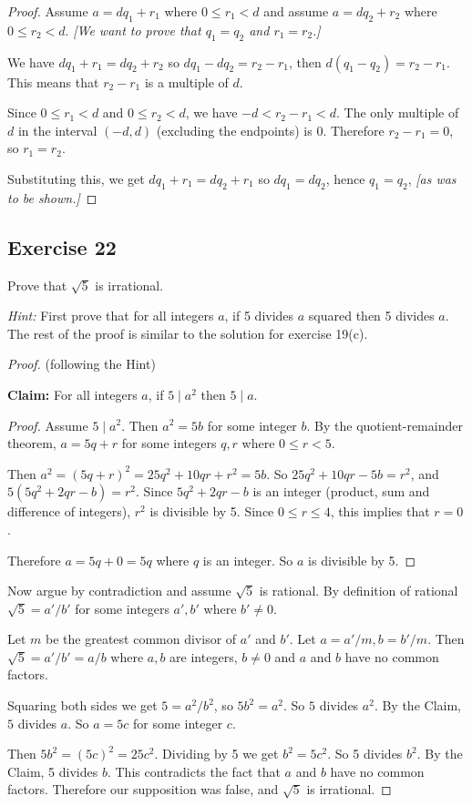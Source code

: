 \documentclass[14pt]{extarticle}
\begin{document}
\begin{proof}
Assume $a = dq_1 + r_1$ where $0 \leq r_1 < d$ and assume $a = dq_2 + r_2$ where $0 \leq r_2 < d$. {\it [We want to prove that $q_1 = q_2$ and $r_1 = r_2$.]}

We have $dq_1 + r_1 = dq_2 + r_2$ so $dq_1 - dq_2 = r_2 - r_1$, then $d(q_1 - q_2) = r_2 - r_1$. This means that $r_2 - r_1$ is a multiple of $d$.

Since $0 \leq r_1 < d$ and $0 \leq r_2 < d$, we have $-d < r_2 - r_1 < d$. The only multiple of $d$ in the interval $(-d, d)$ (excluding the endpoints) is 0. Therefore $r_2 - r_1 = 0$, so $r_1 = r_2$.

Substituting this, we get $dq_1 + r_1 = dq_2 + r_1$ so $dq_1 = dq_2$, hence $q_1 = q_2$, {\it [as was to be shown.]}
\end{proof}

\subsection{Exercise 22}
Prove that $\sqrt{5}$ is irrational.

{\it Hint:} First prove that for all integers $a$, if 5 divides $a$ squared then 5 divides $a$. The rest of the proof is similar to the solution for exercise 19(c).

\begin{proof}
(following the Hint)

{\bf Claim:} For all integers $a$, if $5 \mid a^2$ then $5 \mid a$.

\begin{proof}
Assume $5 \mid a^2$. Then $a^2 = 5b$ for some integer $b$. By the quotient-remainder theorem, $a = 5q+r$ for some integers $q,r$ where $0 \leq r < 5$.

Then $a^2 = (5q+r)^2 = 25q^2 + 10qr + r^2 = 5b$. So $25q^2 + 10qr - 5b = r^2$, and $5(5q^2 + 2qr - b) = r^2$. Since $5q^2 + 2qr - b$ is an integer (product, sum and difference of integers), $r^2$ is divisible by 5. Since $0 \leq r \leq 4$, this implies that $r = 0$.

Therefore $a = 5q + 0 = 5q$ where $q$ is an integer. So $a$ is divisible by 5.
\end{proof}

Now argue by contradiction and assume $\sqrt{5}$ is rational. By definition of rational $\sqrt{5} = a'/b'$ for some integers $a', b'$ where $b' \neq 0$.

Let $m$ be the greatest common divisor of $a'$ and $b'$. Let $a = a'/m, b = b'/m$. Then $\sqrt{5} = a'/b' = a/b$ where $a,b$ are integers, $b \neq 0$ and $a$ and $b$ have no common factors.

Squaring both sides we get $5 = a^2 / b^2$, so $5b^2 = a^2$. So $5$ divides $a^2$. By the Claim, $5$ divides $a$. So $a = 5c$ for some integer $c$.

Then $5b^2 = (5c)^2 = 25c^2$. Dividing by 5 we get $b^2 = 5c^2$. So 5 divides $b^2$. By the Claim, 5 divides $b$. This contradicts the fact that $a$ and $b$ have no common factors. Therefore our supposition was false, and $\sqrt{5}$ is irrational.
\end{proof}
\end{document}
